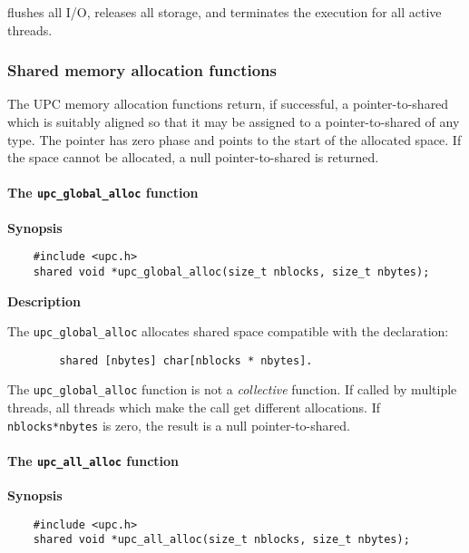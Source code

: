  flushes all I/O, releases all
      storage, and terminates the execution for all active threads.

\subsubsection{Shared memory allocation functions}

\npf The UPC memory allocation functions return, if successful,
    a pointer-to-shared which is suitably aligned so that it may be assigned 
    to a pointer-to-shared of any type.  The pointer has zero phase and points
    to the start of the allocated space.  If the space cannot be allocated, a null
    pointer-to-shared is returned.
    
\paragraph{The {\tt upc\_global\_alloc} function}

{\bf Synopsis} 

\npf\vspace{-2.5em}
\begin{verbatim}
    #include <upc.h> 
    shared void *upc_global_alloc(size_t nblocks, size_t nbytes); 
\end{verbatim}

{\bf Description}

\np The {\tt upc\_global\_alloc} allocates shared space
     compatible with the declaration:

\begin{verbatim}
        shared [nbytes] char[nblocks * nbytes]. 
\end{verbatim}

\np The {\tt upc\_global\_alloc} function is not a {\em
    collective} function. If called by multiple threads,
    all threads which make the call get different allocations.
    If {\tt nblocks*nbytes} is zero, the result is a null pointer-to-shared.
    
\paragraph{The {\tt upc\_all\_alloc} function}

{\bf Synopsis} 

\npf\vspace{-2.5em}
\begin{verbatim}
    #include <upc.h> 
    shared void *upc_all_alloc(size_t nblocks, size_t nbytes); 
\end{verbatim}

